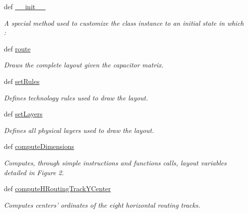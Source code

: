 \begin{DoxyCompactItemize}
\item 
def \hyperlink{classpython_1_1CapacitorRouted_1_1RoutMatchedCapacitor_ac775ee34451fdfa742b318538164070e}{\-\_\-\-\_\-init\-\_\-\-\_\-}
\begin{DoxyCompactList}\small\item\em A special method used to customize the class instance to an initial state in which \-: \end{DoxyCompactList}\item 
def \hyperlink{classpython_1_1CapacitorRouted_1_1RoutMatchedCapacitor_a15ec3e3156133327b307cd0e4b75f22c}{route}
\begin{DoxyCompactList}\small\item\em Draws the complete layout given the capacitor matrix. \end{DoxyCompactList}\item 
def \hyperlink{classpython_1_1CapacitorRouted_1_1RoutMatchedCapacitor_a3b578035b1559391931dade7c2508105}{set\-Rules}
\begin{DoxyCompactList}\small\item\em Defines technology rules used to draw the layout. \end{DoxyCompactList}\item 
def \hyperlink{classpython_1_1CapacitorRouted_1_1RoutMatchedCapacitor_ae361a87f8ad999bb5f1b9851773f481b}{set\-Layers}
\begin{DoxyCompactList}\small\item\em Defines all physical layers used to draw the layout. \end{DoxyCompactList}\item 
def \hyperlink{classpython_1_1CapacitorRouted_1_1RoutMatchedCapacitor_a20b46b43488cc58c302b123a89299d85}{compute\-Dimensions}
\begin{DoxyCompactList}\small\item\em Computes, through simple instructions and functions calls, layout variables detailed in Figure 2. \end{DoxyCompactList}\item 
def \hyperlink{classpython_1_1CapacitorRouted_1_1RoutMatchedCapacitor_ab00cae047369eb93c10e44e316fa991b}{compute\-H\-Routing\-Track\-Y\-Center}
\begin{DoxyCompactList}\small\item\em Computes centers' ordinates of the eight horizontal routing tracks. \end{DoxyCompactList}\item 

\end{DoxyCompactItemize}

